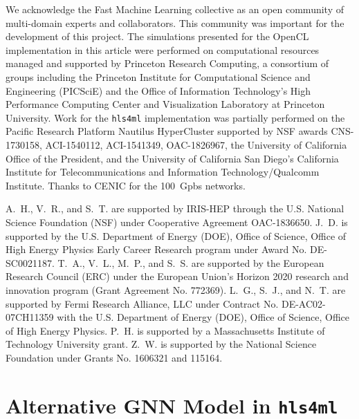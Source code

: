 \documentclass{article}
\newcommand{\hlsfml}{\texttt{hls4ml}\xspace}
\begin{document}

\begin{ack}

We acknowledge the Fast Machine Learning collective as an open community of multi-domain experts and collaborators. 
This community was important for the development of this project. 
The simulations presented for the OpenCL implementation in this article were performed on computational resources managed and supported by Princeton Research Computing, a consortium of groups including the Princeton Institute for Computational Science and Engineering (PICSciE) and the Office of Information Technology's High Performance Computing Center and Visualization Laboratory at Princeton University.
Work for the \texttt{hls4ml} implementation was partially performed on the Pacific Research Platform Nautilus HyperCluster supported by NSF awards CNS-1730158, ACI-1540112, ACI-1541349, OAC-1826967, the University of California Office of the President, and the University of California San Diego's California Institute for Telecommunications and Information Technology/Qualcomm Institute. 
Thanks to CENIC for the 100~Gpbs networks.

A.~H., V.~R., and S.~T. are supported by IRIS-HEP through the U.S. National Science Foundation (NSF) under Cooperative Agreement OAC-1836650.
J.~D. is supported by the U.S. Department of Energy (DOE), Office of Science, Office of High Energy Physics Early Career Research program under Award No. DE-SC0021187.
T.~A., V.~L., M.~P., and S.~S. are supported by the European Research Council (ERC) under the European Union's Horizon 2020 research and innovation program (Grant Agreement No. 772369).
L.~G., S.~J., and N.~T. are supported by Fermi Research Alliance, LLC under Contract No. DE-AC02-07CH11359 with the U.S. Department of Energy (DOE), Office of Science, Office of High Energy Physics.
P.~H. is supported by a Massachusetts Institute of Technology University grant. 
Z.~W. is supported by the National Science Foundation under Grants No. 1606321 and 115164.

\end{ack}

\appendix

\section{Alternative GNN Model in \hlsfml}
\label{sec:hls4mlmodelv2}
\end{document}
